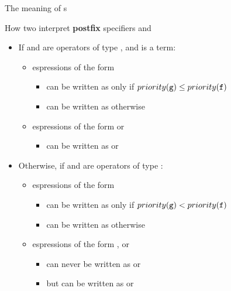 \documentclass[handout]{beamer}
\begin{document}
\begin{frame}[allowframebreaks]{The meaning of s}
    \begin{exampleblock}{How two interpret \textbf{postfix} specifiers  and }
        \begin{itemize}
            \item If  and  are operators of type , and  is a term:
            \begin{itemize}
                \item espressions of the form \alert{}
                \begin{itemize}
                    \item can be written as \alert{} only if $priority(\texttt{g}) \leq priority(\texttt{f})$
                    \item can be written as \alert{} otherwise
                \end{itemize}

                \item espressions of the form \alert{} or \alert{}
                \begin{itemize}
                    \item can be written as \alert{} or \alert{}
                \end{itemize}
            \end{itemize}

            \item Otherwise, if  and  are operators of type :
            \begin{itemize}
                \item espressions of the form \alert{}
                \begin{itemize}
                    \item can be written as \alert{} only if $priority(\texttt{g}) < priority(\texttt{f})$
                    \item can be written as \alert{} otherwise
                \end{itemize}

                \item espressions of the form \alert{}, or \alert{}
                \begin{itemize}
                    \item can \alert{never} be written as \alert{} or \alert{}
                    \item but can be written as \alert{} or \alert{}
                \end{itemize}
            \end{itemize}
        \end{itemize}
    \end{exampleblock}


\end{frame}
\end{document}
